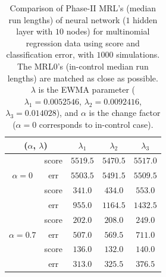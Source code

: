 \documentclass[twoside,11pt]{article}
\begin{document}
\begin{table}[!t]
\centering
\begin{tabular}{ccccc}
\toprule
\multicolumn{2}{c}{($ \alpha$, $ \lambda$)} & {$ \lambda_1$} & {$ \lambda_2$} & {$ \lambda_3$} \\
\midrule
\multirow{3}{*}{$\alpha=0$} & score &$5519.5$ & $5470.5$ & $5517.0$ \\
& err &$5503.5$ & $5491.5$ & $5509.5$ \\
\midrule
\multirow{3}{*}{$\alpha=0.5$} & score &$ \bm{341.0}$ & $\bm{434.0}$ & $\bm{553.0}$ \\
& err &$955.0$ & $1164.5$ & $1432.5$ \\
\midrule
\multirow{3}{*}{$\alpha=0.7$} & score &$\bm{202.0}$ & $\bm{208.0}$ & $\bm{249.0}$ \\
& err &$507.0$ & $569.5$ & $711.0$ \\
\midrule
\multirow{3}{*}{$\alpha=0.9$} & score &$\bm{136.0}$ & $\bm{132.0}$ & $\bm{140.0}$ \\
& err &$313.0$ & $325.5$ & $376.5$ \\
\midrule
\end{tabular}
\caption{Comparison of Phase-II MRL's (median run lengths) of neural network ($1$ hidden layer with $10$ nodes) for multinomial regression data using score and classification error, with $1000$ simulations. The MRL0's (in-control median run lengths) are matched as close as possible. $ \lambda$ is the EWMA parameter ({$ \lambda_1 =0.0052546$}, {$ \lambda_2=0.0092416$}, {$ \lambda_3 =0.014028$}), and $ \alpha$ is the change factor ($ \alpha=0$ corresponds to in-control case).}
\label{tab:multi_logi_nnet_MRL}
\end{table}
\end{document}
